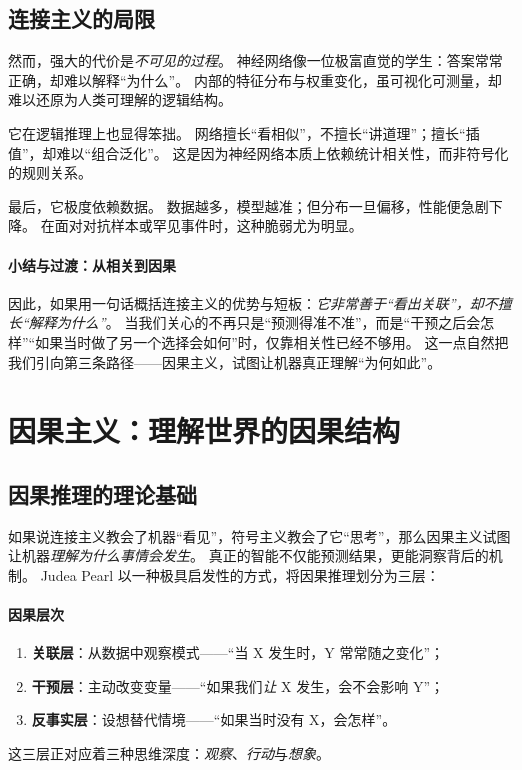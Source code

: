 \subsection{连接主义的局限}

然而，强大的代价是\emph{不可见的过程}。  
神经网络像一位极富直觉的学生：答案常常正确，却难以解释“为什么”。  
内部的特征分布与权重变化，虽可视化可测量，却难以还原为人类可理解的逻辑结构。

它在逻辑推理上也显得笨拙。  
网络擅长“看相似”，不擅长“讲道理”；擅长“插值”，却难以“组合泛化”。  
这是因为神经网络本质上依赖统计相关性，而非符号化的规则关系。

最后，它极度依赖数据。  
数据越多，模型越准；但分布一旦偏移，性能便急剧下降。  
在面对对抗样本或罕见事件时，这种脆弱尤为明显。  

\paragraph{小结与过渡：从相关到因果}
因此，如果用一句话概括连接主义的优势与短板：\emph{它非常善于“看出关联”，却不擅长“解释为什么”}。  
当我们关心的不再只是“预测得准不准”，而是“干预之后会怎样”“如果当时做了另一个选择会如何”时，仅靠相关性已经不够用。  
这一点自然把我们引向第三条路径——因果主义，试图让机器真正理解“为何如此”。

\section{因果主义：理解世界的因果结构}

\subsection{因果推理的理论基础}

如果说连接主义教会了机器“看见”，符号主义教会了它“思考”，那么因果主义试图让机器\emph{理解为什么事情会发生}。  
真正的智能不仅能预测结果，更能洞察背后的机制。  
Judea Pearl 以一种极具启发性的方式，将因果推理划分为三层：

\paragraph{因果层次}
\begin{enumerate}
\item \textbf{关联层}：从数据中观察模式——“当 X 发生时，Y 常常随之变化”；  
\item \textbf{干预层}：主动改变变量——“如果我们\emph{让} X 发生，会不会影响 Y”；  
\item \textbf{反事实层}：设想替代情境——“如果当时没有 X，会怎样”。  
\end{enumerate}
这三层正对应着三种思维深度：\emph{观察}、\emph{行动}与\emph{想象}。

